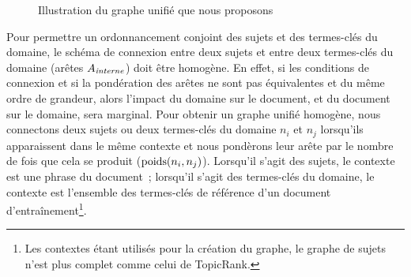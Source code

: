 \begin{figure}
      \caption{Illustration du graphe unifié que nous proposons 
               \label{fig:topiccorank_graph}}
    \end{figure}

    Pour permettre un ordonnancement conjoint des sujets et des termes-clés du
    domaine, le schéma de connexion entre deux sujets et entre deux termes-clés
    du domaine (arêtes $A_\textnormal{\textit{interne}}$) doit être homogène. En
    effet, si les conditions de connexion et si la pondération des arêtes ne
    sont pas équivalentes et du même ordre de grandeur, alors l'impact du
    domaine sur le document, et du document sur le domaine, sera marginal. Pour
    obtenir un graphe unifié homogène, nous connectons deux sujets ou deux
    termes-clés du domaine $n_i$ et $n_j$ lorsqu'ils apparaissent dans le même
    contexte et nous pondèrons leur arête par le nombre de fois que cela se produit
    ($\textnormal{poids}(n_i, n_j)$). Lorsqu'il s'agit des sujets, le contexte
    est une phrase du document~; lorsqu'il s'agit des termes-clés du domaine, le
    contexte est l'ensemble des termes-clés de référence d'un document
    d'entraînement\footnote{Les contextes étant utilisés pour la création du
    graphe, le graphe de sujets n'est plus complet comme celui de TopicRank.}.


